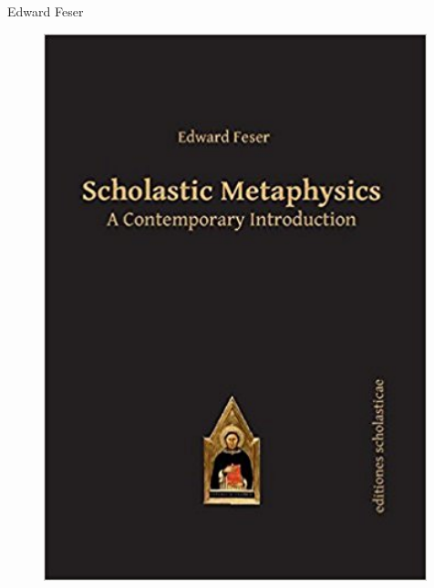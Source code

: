 \documentclass[xcolor=dvipsnames]{beamer}
\begin{document}
\begin{frame}{Edward Feser}
\begin{figure}
\begin{columns}
    \includegraphics[width=0.99\textwidth]{metaphysics}
  \end{columns}
\end{figure}
\end{frame}
\end{document}
